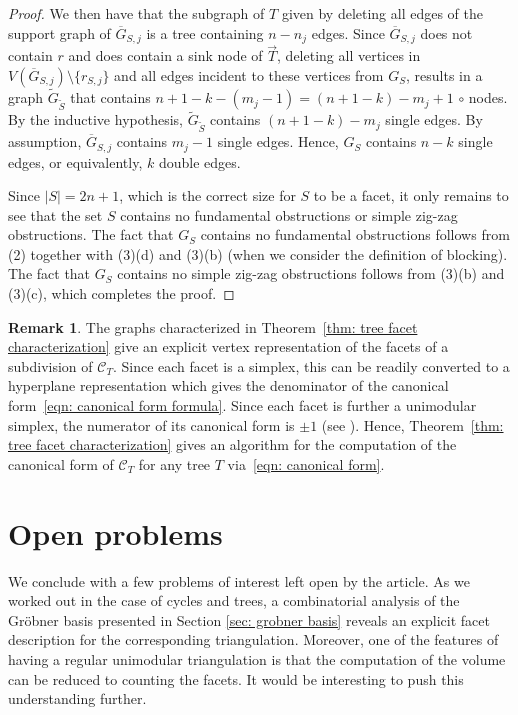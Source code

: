 \documentclass[11pt]{article}
\theoremstyle{definition}
\newtheorem{rema}[theo]{Remark}
\numberwithin{equation}{section}
\begin{document}
\begin{proof}
We then have that the subgraph of $T$ given by deleting all edges of the support graph of $\overline{G}_{S,j}$ is a tree containing $n-n_j$ edges.  
Since $\overline{G}_{S,j}$ does not contain $r$ and does contain a sink node of $\overrightarrow{T}$, deleting all vertices in $V(\overline{G}_{S,j})\setminus \{r_{S,j}\}$ and all edges incident to these vertices from $G_S$, results in a graph $\widetilde{G}_{\tilde{S}}$ that contains $n+1-k-(m_j-1) = (n+1 - k) -m_j+1$ $\circ$ nodes. 
By the inductive hypothesis, $\widetilde{G}_{\widetilde{S}}$ contains $(n+1-k) - m_j$ single edges. 
By assumption, $\overline{G}_{S,j}$ contains $m_j-1$ single edges.  
Hence, $G_S$ contains $n-k$ single edges, or equivalently, $k$ double edges.  

Since $|S| = 2n+1$, which is the correct size for $S$ to be a facet, it only remains to see that the set $S$ contains no fundamental obstructions or simple zig-zag obstructions.  
The fact that $G_S$ contains no fundamental obstructions follows from (2) together with (3)(d) and (3)(b) (when we consider the definition of blocking).  
The fact that $G_S$ contains no simple zig-zag obstructions follows from (3)(b) and (3)(c), which completes the proof. 
\end{proof}

\begin{rema}
    The graphs characterized in Theorem~\ref{thm: tree facet characterization} give an explicit vertex representation of the facets of a subdivision of $\mathcal{C}_T$. 
    Since each facet is a simplex, this can be readily converted to a hyperplane representation which gives the denominator of the canonical form~\eqref{eqn: canonical form formula}.
    Since each facet is further a unimodular simplex, the numerator of its canonical form is $\pm1$ (see \cite[Section~1]{lam2022invitation}). 
    Hence, Theorem~\ref{thm: tree facet characterization} gives an algorithm for the computation of the canonical form of $\mathcal{C}_T$ for any tree $T$ via~\eqref{eqn: canonical form}.
\end{rema}

\section{Open problems}

We conclude with a few problems of interest left open by the article. As we worked out in the case of cycles and trees, a combinatorial analysis of the Gr\"{o}bner basis presented in Section \ref{sec: grobner basis} reveals an explicit facet description for the corresponding triangulation. Moreover, one of the features of having a regular unimodular triangulation is that the computation of the volume can be reduced to counting the facets. It would be interesting to push this understanding further. 
\end{document}
